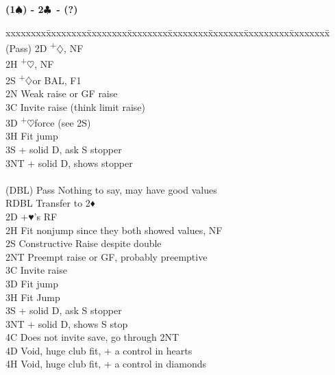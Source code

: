 \documentclass[10pt]{article}
\renewcommand{\c}{$\clubsuit$}
\renewcommand{\d}{$\diamondsuit$}
\newcommand{\h}{$\heartsuit$}
\newcommand{\s}{$\spadesuit$}
\newcommand{\p}{\textsuperscript{+}}
\newcommand{\x}{DBL}
\newenvironment{bidtable}[1][]
{\textbf{#1}
  \begin{adjustwidth}{1em}{}
    \addvspace{2pt}
    \begin{tabbing}
      xxxxxxxx\=xxxxxxxx\=xxxxxxxx\=xxxxxxxx\=xxxxxxxx\=xxxxxxx\=xxxxxxxxx\=xxxxxxxx\=\kill}
{\end{tabbing}\end{adjustwidth}\bigskip}%
\begin{document}
\begin{bidtable}[(1\s) - 2\c\ - (?)]
(Pass) \> 2D   \p\d, NF                                      \\
       \> 2H   \p\h, NF                                      \\
       \> 2S   \p\d or BAL, F1                               \\
       \> 2N   \> Weak raise or GF raise                         \\
       \> 3C   \> Invite raise (think limit raise)               \\
       \> 3D   \p\h force (see 2S)                             \\
       \> 3H   \> Fit jump                                       \\
       \> 3S   + solid D, ask S stopper                      \\
       \> 3NT  + solid D, shows stopper                      \\
                                                                 \\
(\x)   \> Pass \> Nothing to say, may have good values           \\
       \> RDBL \> Transfer to 2♦                                 \\
       \> 2D   +♥’s RF                                       \\
       \> 2H   \> Fit nonjump since they both showed values, NF  \\
       \> 2S   \> Constructive Raise despite double              \\
       \> 2NT  \> Preempt raise or GF, probably preemptive       \\
       \> 3C   \> Invite raise                                   \\
       \> 3D   \> Fit jump                                       \\
       \> 3H   \> Fit Jump                                       \\
       \> 3S   + solid D, ask S stopper                      \\
       \> 3NT  + solid D, shows S stop                       \\
       \> 4C   \> Does not invite save, go through 2NT           \\
       \> 4D   \> Void, huge club fit, + a control in hearts     \\
       \> 4H   \> Void, huge club fit, + a control in diamonds   \\

\end{bidtable}
\end{document}
